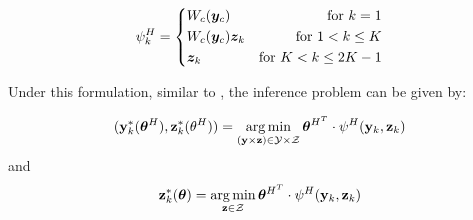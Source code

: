 \begin{equation}
\label{eq:llsvm_feature}
  \psi_k^H = \left\{
		\begin{aligned}
      & W_c({\bm{y}}_c) 	& \text{for} \ k=1\\
      & W_c({\bm{y}}_c){\bm{z}}_k & \text{for}\ 1<k\le K\\
      & {\bm{z}}_k & \text{for} \ K<k\le2K-1\\
		\end{aligned}
  \right.
\end{equation}

Under this formulation, similar to \cite{yu2009learning}, the inference problem
can be given by:

\begin{align}
  \label{eq:linenv_full_inf}
  (\mathbf{y}^*_k({\bm{\theta}}^H),\mathbf{z}^*_k(\theta^H))=\operatorname*{arg\,min}_{(\mathbf{y}
  \times \mathbf{z}) \in \mathcal{Y} \times \mathcal{Z}}
  {\bm{\theta}}^{H^T}\cdot\psi^H(\mathbf{y}_k,\mathbf{z}_k)
\end{align}
and
\begin{align}
  \label{eq:linenv_latent_inf}
  \mathbf{z}^*_k({\bm{\theta}}) = \operatorname*{arg\,min}_{\mathbf{z} \in \mathcal{Z}}
  {\bm{\theta}}^{H^T} \cdot \psi^H(\mathbf{y}_k,\mathbf{z}_k)
\end{align}

